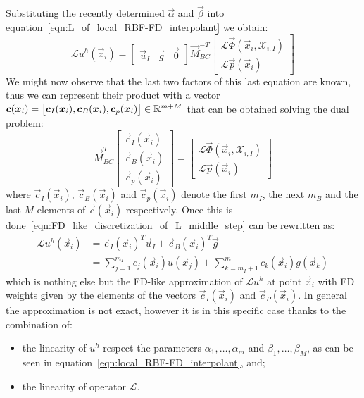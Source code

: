 \medskip
Substituting the recently determined $\vec{\alpha}$ and $\vec{\beta}$ into equation~\eqref{eqn:L_of_local_RBF-FD_interpolant} we obtain:
\begin{equation}
	\label{eqn:FD_like_discretization_of_L_middle_step}
	\mathcal{L} u^h(\vec{x}_i) = 
	\begin{bmatrix}
		\vec{u}_I  &  \vec{g}  &  \vec{0}
	\end{bmatrix}
	\vec{M}_{BC}^{-T}
	\begin{bmatrix}
		\mathcal{L} \vec{\Phi}(\vec{x}_i, \mathcal{X}_{i,I})  \\
		\mathcal{L} \vec{p}(\vec{x}_i)
	\end{bmatrix}	
\end{equation}
We might now observe that the last two factors of this last equation are known, thus we can represent their product with a vector $\boldsymbol{c}(\boldsymbol{x}_i) = \bigl[ \boldsymbol{c}_I(\boldsymbol{x}_i), \boldsymbol{c}_B(\boldsymbol{x}_i), \boldsymbol{c}_p(\boldsymbol{x}_i) \bigr] \in \mathbb{R}^{m+M}$ that can be obtained solving the dual problem:
\begin{equation}
\label{eqn:row_of_C_system}
	\vec{M}_{BC}^T
	\begin{bmatrix}
		\vec{c}_I(\vec{x}_i)  \\
		\vec{c}_B(\vec{x}_i)  \\
		\vec{c}_p(\vec{x}_i)
   \end{bmatrix} = 
	\begin{bmatrix}
		\mathcal{L} \vec{\Phi}(\vec{x}_i, \mathcal{X}_{i,I})  \\
		\mathcal{L} \vec{p}(\vec{x}_i)
	\end{bmatrix}
\end{equation}
where $\vec{c}_I(\vec{x}_i)$, $\vec{c}_B(\vec{x}_i)$ and $\vec{c}_p(\vec{x}_i)$ denote the first $m_I$, the next $m_B$ and the last $M$ elements of $\vec{c}(\vec{x}_i)$ respectively.
Once this is done~\eqref{eqn:FD_like_discretization_of_L_middle_step} can be rewritten as:
\begin{equation}
	\begin{aligned}
		\mathcal{L} u^h(\vec{x}_i) & = \vec{c}_I(\vec{x}_i)^T \vec{u}_I + \vec{c}_B(\vec{x}_i)^T \vec{g}  \\[2ex]
								   & = \sum_{j=1}^{m_I} c_j(\vec{x}_i) u(\vec{x}_j) + \sum_{k=m_I+1}^{m} c_k(\vec{x}_i)g(\vec{x}_k)
	\end{aligned}
\end{equation}
which is nothing else but the FD-like approximation of $\mathcal{L}u^h$ at point $\vec{x}_i$ with FD weights given by the elements of the vectors $\vec{c}_I(\vec{x}_i)$ and $\vec{c}_P(\vec{x}_i)$. In general the approximation is not exact, however it is in this specific case thanks to the combination of:
\begin{itemize}
	\item the linearity of $u^h$ respect the parameters $\alpha_1, \dots, \alpha_m$ and $\beta_1, \dots, \beta_M$, as can be seen in equation~\eqref{eqn:local_RBF-FD_interpolant}, and;
	\item the linearity of operator $\mathcal{L}$.
\end{itemize}


